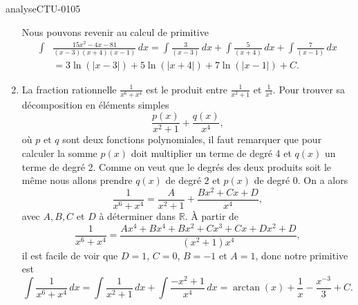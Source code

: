 \begin{corrige}{analyseCTU-0105}
\begin{enumerate}
Nous pouvons revenir au calcul de primitive 
\begin{equation*}
  \begin{aligned}
    \int &\frac{15x^2-4x-81}{(x-3)(x+4)(x-1)}\, dx = \int \frac{3}{(x-3)} \, dx +  \int \frac{5}{(x+4)} \, dx + \int \frac{7}{(x-1)} \, dx\\
& = 3\ln(|x-3|) + 5\ln(|x+4|) + 7\ln(|x-1|)+C. 
  \end{aligned}
\end{equation*}
  \item La fraction rationnelle $\displaystyle \frac{1}{x^6+x^4}$ est le produit entre $\displaystyle \frac{1}{x^2+1}$ et $\displaystyle \frac{1}{x^4}$. Pour trouver sa d\'ecomposition en \'el\'ements simples
    \begin{equation*}
      \frac{p(x)}{x^2+1} + \frac{q(x)}{x^4},
    \end{equation*}
o\`u $p$ et $q$ sont deux fonctions polynomiales, il faut remarquer que pour calculer la somme $p(x)$ doit multiplier un terme de degr\'e 4 et $q(x)$ un terme de degr\'e 2. Comme on veut que le degr\'es des deux produits soit le m\^eme nous allons prendre $q(x)$ de degr\'e $2$ et $p(x)$ de degr\'e $0$. On a alors 
\begin{equation*}
   \frac{1}{x^6+x^4} = \frac{A}{x^2+1} + \frac{Bx^2 + Cx +D}{x^4},  
\end{equation*}
avec $A, B, C$ et $D$ \`a d\'eterminer dans $\mathbb{R}$. \`A partir de 
\begin{equation*}
   \frac{1}{x^6+x^4} = \frac{Ax^4 + Bx^4+ Bx^2 + Cx^3 + Cx +Dx^2 +D }{(x^2+1)x^4}, 
\end{equation*}
il est facile de voir que $D=1$, $C=0$, $B=-1$ et $A=1$, donc notre primitive est 
\begin{equation*}
  \int \frac{1}{x^6+x^4}\, dx = \int \frac{1}{x^2+1}\, dx  + \int \frac{-x^2  +1}{x^4} \, dx =\arctan(x) + \frac{1}{x} -\frac{x^{-3}}{3} + C.
\end{equation*}
  \end{enumerate}
\end{corrige}

